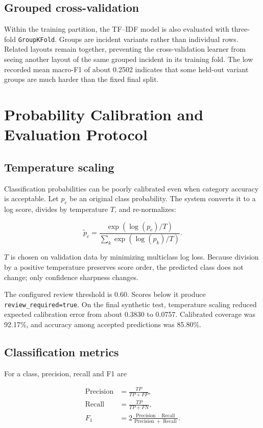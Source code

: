 \documentclass[12pt,a4paper]{report}
\newcommand{\code}[1]{\texttt{#1}}
\begin{document}
\section{Grouped cross-validation}

Within the training partition, the TF--IDF model is also evaluated with three-fold \code{GroupKFold}. Groups are incident variants rather than individual rows. Related layouts remain together, preventing the cross-validation learner from seeing another layout of the same grouped incident in its training fold. The low recorded mean macro-F1 of about 0.2502 indicates that some held-out variant groups are much harder than the fixed final split.

\chapter{Probability Calibration and Evaluation Protocol}

\section{Temperature scaling}

Classification probabilities can be poorly calibrated even when category accuracy is acceptable. Let $p_c$ be an original class probability. The system converts it to a log score, divides by temperature $T$, and re-normalizes:

\begin{equation}
\tilde{p}_c=\frac{\exp(\log(p_c)/T)}{\sum_k\exp(\log(p_k)/T)}.
\end{equation}

$T$ is chosen on validation data by minimizing multiclass log loss. Because division by a positive temperature preserves score order, the predicted class does not change; only confidence sharpness changes.

The configured review threshold is 0.60. Scores below it produce \code{review\_required=true}. On the final synthetic test, temperature scaling reduced expected calibration error from about 0.3830 to 0.0757. Calibrated coverage was 92.17\%, and accuracy among accepted predictions was 85.80\%.

\section{Classification metrics}

For a class, precision, recall and F1 are

\begin{align}
\operatorname{Precision}&=\frac{TP}{TP+FP},\\
\operatorname{Recall}&=\frac{TP}{TP+FN},\\
F_1&=2\frac{\operatorname{Precision}\cdot\operatorname{Recall}}
{\operatorname{Precision}+\operatorname{Recall}}.
\end{align}
\end{document}
